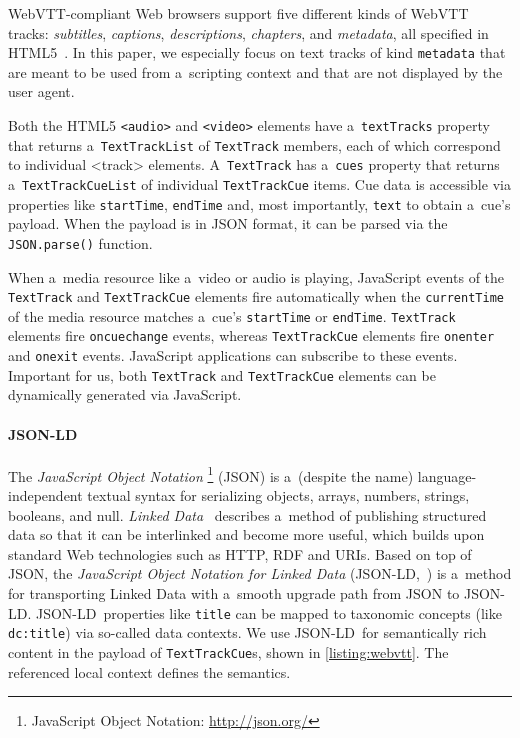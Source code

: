 \documentclass{sig-alternate}
\newcommand{\inlinelistingsize}{\fontsize{8pt}{11pt}}
\let\oldurl\url
\renewcommand{\url}[1]{\inlinelistingsize\oldurl{#1}}
\def\JSONLD{\mbox{JSON-LD}}
\begin{document}
WebVTT-compliant Web browsers %
support five different kinds of
WebVTT tracks: \emph{subtitles}, \emph{captions},
\emph{descriptions}, \emph{chapters}, and \emph{metadata},
all specified in HTML5~\cite{berjon2013html5}.
In this paper, we especially focus on
text tracks of kind \texttt{metadata}
that are meant to be used from a~scripting context and
that are not displayed by the user agent.

Both the HTML5 \texttt{<audio>} and \texttt{<video>} elements
have a~\texttt{textTracks} property
that returns a~\texttt{TextTrackList} of
\texttt{TextTrack} members, each of which correspond
to individual <track> elements.
A~\texttt{TextTrack} has a~\texttt{cues} property
that returns a~\texttt{TextTrackCueList} of individual
\texttt{TextTrackCue} items.
Cue data is accessible via properties like
\texttt{startTime}, \texttt{endTime} and,
most importantly, \texttt{text} to obtain a~cue's payload.
When the payload is in JSON format,
it can be parsed via the
\texttt{JSON.parse()} function.

When a~media resource like a~video or audio is playing,
JavaScript events of the \texttt{TextTrack} and \texttt{TextTrackCue}
elements fire automatically when the \texttt{currentTime}
of the media resource matches
a~cue's \texttt{startTime} or \texttt{endTime}.
\texttt{TextTrack} elements fire \texttt{oncuechange} events,
whereas \texttt{TextTrackCue} elements fire
\texttt{onenter} and \texttt{onexit} events.
JavaScript applications can subscribe to these events.
Important for us, both \texttt{TextTrack} and
\texttt{TextTrackCue} elements
can be dynamically generated via JavaScript.

\paragraph{\JSONLD}

The \emph{JavaScript Object Notation}%
\footnote{JavaScript Object Notation: \url{http://json.org/}}
(JSON)
is a~(despite the name) language-independent textual syntax
for serializing objects, arrays, numbers, strings, booleans, and null.
\emph{Linked Data}~\cite{bizer2009linkeddata}
describes a~method of publishing structured data
so that it can be interlinked and become more useful,
which builds upon standard Web technologies such as HTTP, RDF and URIs.
Based on top of JSON, the
\emph{JavaScript Object Notation for Linked Data}
(\JSONLD,~\cite{sporny2013jsonld}) is a~method for transporting
Linked Data with a~smooth upgrade path from JSON to \JSONLD.
\JSONLD~properties like \texttt{title} can be mapped to taxonomic
concepts (like \texttt{dc:title}) via so-called data contexts.
We use \JSONLD\ for semantically rich content
in the payload of \texttt{TextTrackCue}s, shown in
\autoref{listing:webvtt}.
The referenced local context defines the semantics.
\end{document}
